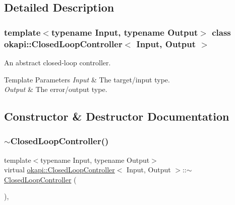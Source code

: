 \subsection{Detailed Description}
\subsubsection*{template$<$typename Input, typename Output$>$\newline
class okapi\+::\+Closed\+Loop\+Controller$<$ Input, Output $>$}

An abstract closed-\/loop controller.


\begin{DoxyTemplParams}{Template Parameters}
{\em Input} & The target/input type. \\
\hline
{\em Output} & The error/output type. \\
\hline
\end{DoxyTemplParams}


\subsection{Constructor \& Destructor Documentation}
\mbox{\label{classokapi_1_1ClosedLoopController_a7fa88d53b8f248e0894b8e0865918d5b}} 
\subsubsection{\texorpdfstring{$\sim$ClosedLoopController()}{~ClosedLoopController()}}
{\footnotesize\ttfamily template$<$typename Input, typename Output$>$ \\
virtual \mbox{\hyperlink{classokapi_1_1ClosedLoopController}{okapi\+::\+Closed\+Loop\+Controller}}$<$ Input, Output $>$\+::$\sim$\mbox{\hyperlink{classokapi_1_1ClosedLoopController}{Closed\+Loop\+Controller}} (\begin{DoxyParamCaption}{ }\end{DoxyParamCaption})\hspace{0.3cm}{\ttfamily [virtual]}, {\ttfamily [default]}}




